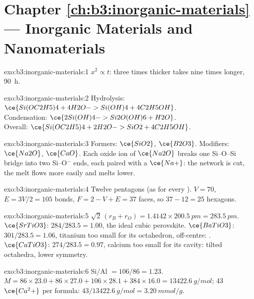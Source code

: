 \section*{Chapter \ref{ch:b3:inorganic-materials} --- Inorganic Materials and Nanomaterials}

\begin{solution}{exo:b3:inorganic-materials:1}
$x^2 \propto t$: three times thicker takes nine times longer, \qty{90}{h}.
\end{solution}

\begin{solution}{exo:b3:inorganic-materials:2}
Hydrolysis: $\ce{Si(OC2H5)4 + 4H2O -> Si(OH)4 + 4C2H5OH}$.\\
Condensation: $\ce{2Si(OH)4 -> Si2O(OH)6 + H2O}$.\\
Overall: $\ce{Si(OC2H5)4 + 2H2O -> SiO2 + 4C2H5OH}$.
\end{solution}

\begin{solution}{exo:b3:inorganic-materials:3}
Formers: $\ce{SiO2}$, $\ce{B2O3}$. Modifiers: $\ce{Na2O}$, $\ce{CaO}$. Each oxide ion of $\ce{Na2O}$ breaks one Si--O--Si
bridge into two Si--O$^-$ ends, each paired with a $\ce{Na+}$: the network is cut, the melt
flows more easily and melts lower.
\end{solution}

\begin{solution}{exo:b3:inorganic-materials:4}
Twelve pentagons (as for every ). $V = 70$, $E = 3V/2 = 105$ bonds, $F = 2 - V + E = 37$
faces, so $37 - 12 = 25$ hexagons.
\end{solution}

\begin{solution}{exo:b3:inorganic-materials:5}
$\sqrt2\,(r_B + r_O) = 1.4142 \times \qty{200.5}{pm} = \qty{283.5}{pm}$. $\ce{SrTiO3}$: $284/283.5 = 1.00$, the ideal cubic perovskite.
$\ce{BaTiO3}$: $301/283.5 = 1.06$, titanium too small for its octahedron, off-centre: .
$\ce{CaTiO3}$: $274/283.5 = 0.97$, calcium too small for its cavity: tilted octahedra, lower
symmetry.
\end{solution}

\begin{solution}{exo:b3:inorganic-materials:6}
Si/Al $= 106/86 = 1.23$. $M = 86 \times 23.0 + 86 \times 27.0 + 106 \times 28.1 + 384 \times 16.0 = \qty{13422.6}{g/mol}$; 43 $\ce{Ca^2+}$ per
formula: $43/\qty{13422.6}{g/mol} = \qty{3.20}{mmol/g}$.
\end{solution}


